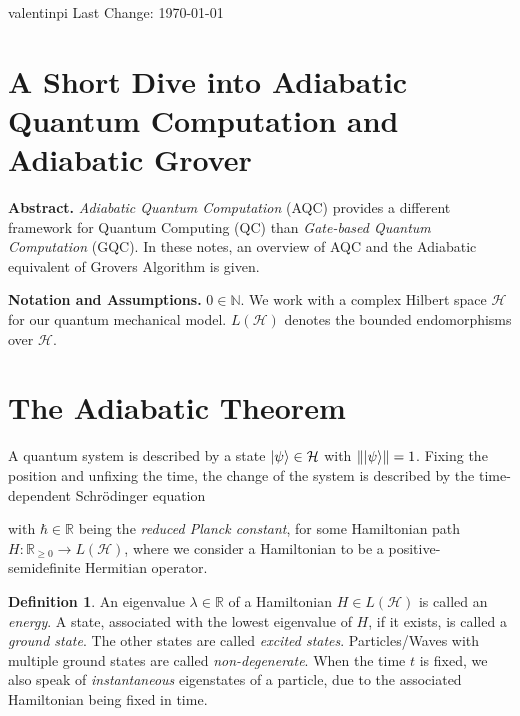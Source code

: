 \documentclass[10pt]{amsart}
\theoremstyle{definition}
\newtheorem{definition}{Definition}
\theoremstyle{remark}
\begin{document}

    valentinpi \hfill Last Change: \today{}

    \section*{A Short Dive into Adiabatic Quantum Computation and Adiabatic Grover}

    \textbf{Abstract.} \emph{Adiabatic Quantum Computation} (AQC) provides a different framework for Quantum Computing (QC) than \emph{Gate-based Quantum Computation} (GQC). In these notes, an overview of AQC and the Adiabatic equivalent of Grovers Algorithm is given.

    \textbf{Notation and Assumptions.} \(0 \in \mathbb{N}\). We work with a complex Hilbert space \(\mathcal{H}\) for our quantum mechanical model. \(L(\mathcal{H})\) denotes the bounded endomorphisms over \(\mathcal{H}\).

    \section{The Adiabatic Theorem}

    A quantum system is described by a state \(\ket{\psi}\in \mathcal{H}\) with \(\norm{\ket{\psi}} = 1\). Fixing the position and unfixing the time, the change of the system is described by the time-dependent Schrödinger equation
    
    \phantom{}

    
    \phantom{}

    with \(\hbar \in \mathbb{R}\) being the \emph{reduced Planck constant}, for some Hamiltonian path \(H\colon \mathbb{R}_{\geq 0} \to L(\mathcal{H})\), where we consider a Hamiltonian to be a positive-semidefinite Hermitian operator.
    \begin{definition}
        An eigenvalue \(\lambda \in \mathbb{R}\) of a Hamiltonian \(H \in L(\mathcal{H})\) is called an \emph{energy}. A state, associated with the lowest eigenvalue of \(H\), if it exists, is called a \emph{ground state}. The other states are called \emph{excited states}. Particles/Waves with multiple ground states are called \emph{non-degenerate}. When the time \(t\) is fixed, we also speak of \emph{instantaneous} eigenstates of a particle, due to the associated Hamiltonian being fixed in time.
    \end{definition}
\end{document}
